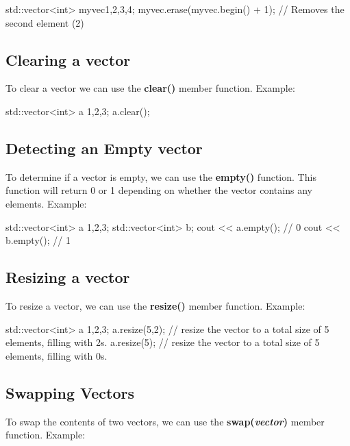 \documentclass{report}
\begin{document}
    \begin{cppcode}
std::vector<int> myvec{1,2,3,4};
myvec.erase(myvec.begin() + 1); // Removes the second element (2)
    \end{cppcode}
    

    \bigbreak \noindent 
    \subsection{Clearing a vector}
    \bigbreak \noindent 
    To clear a vector we can use the \textbf{clear()} member function.
    \bigbreak \noindent 
    Example:
    \bigbreak \noindent 
    
    \begin{cppcode}
std::vector<int> a {1,2,3};
a.clear();
    \end{cppcode}
    

    \bigbreak \noindent 
    \subsection{Detecting an Empty vector}
    \bigbreak \noindent 
    To determine if a vector is empty, we can use the \textbf{empty()} function. This function will return 0 or 1 depending on whether the vector contains any elements.
    \bigbreak \noindent 
    Example:
    \bigbreak \noindent 
    
    \begin{cppcode}
std::vector<int> a {1,2,3};
std::vector<int> b;
cout << a.empty(); // 0
cout << b.empty(); // 1
    \end{cppcode}
    

    \bigbreak \noindent 
    \subsection{Resizing a vector}
    \bigbreak \noindent 
    To resize a vector, we can use the \textbf{resize()} member function.
    \bigbreak \noindent 
    Example:
    \bigbreak \noindent 
    
    \begin{cppcode}
std::vector<int> a {1,2,3};
a.resize(5,2); // resize the vector to a total size of 5 elements, filling with 2s.
a.resize(5); // resize the vector to a total size of 5 elements, filling with 0s.
    \end{cppcode}
    

    \bigbreak \noindent 
    \subsection{Swapping Vectors}
    \bigbreak \noindent 
    To swap the contents of two vectors, we can use the \textbf{swap(\textit{vector})} member function.
    \bigbreak \noindent 
    Example:
    \bigbreak \noindent 
    
\end{document}
